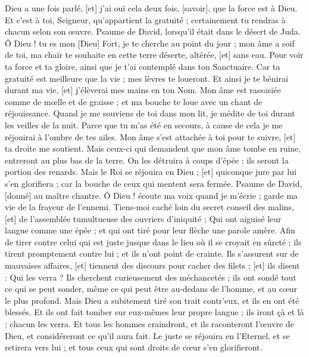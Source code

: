\begin{multicols}{2}
Dieu a une fois parlé, [et] j'ai ouï cela deux fois, [savoir], que la force est à Dieu.
Et c'est à toi, Seigneur, qu'appartient la gratuité ; certainement tu rendras à chacun selon son œuvre.
\VerseOne{}Psaume de David, lorsqu'il était dans le désert de Juda. Ô Dieu ! tu es mon [Dieu] Fort, je te cherche au point du jour ; mon âme a soif de toi, ma chair te souhaite en cette terre déserte, altérée, [et] sans eau.
Pour voir ta force et ta gloire, ainsi que je t'ai contemplé dans ton Sanctuaire.
Car ta gratuité est meilleure que la vie ; mes lèvres te loueront.
Et ainsi je te bénirai durant ma vie, [et] j'élèverai mes mains en ton Nom.
Mon âme est rassasiée comme de mœlle et de graisse ; et ma bouche te loue avec un chant de réjouissance.
Quand je me souviens de toi dans mon lit, je médite de toi durant les veilles de la nuit.
Parce que tu m'as été en secours, à cause de cela je me réjouirai à l'ombre de tes ailes.
Mon âme s'est attachée à toi pour te suivre, [et] ta droite me soutient.
Mais ceux-ci qui demandent que mon âme tombe en ruine, entreront au plus bas de la terre.
On les détruira à coups d'épée ; ils seront la portion des renards.
Mais le Roi se réjouira en Dieu ; [et] quiconque jure par lui s'en glorifiera ; car la bouche de ceux qui mentent sera fermée.
\VerseOne{}Psaume de David, [donné] au maître chantre. Ô Dieu ! écoute ma voix quand je m'écrie ; garde ma vie de la frayeur de l'ennemi.
Tiens-moi caché loin du secret conseil des malins, [et] de l'assemblée tumultueuse des ouvriers d'iniquité ;
Qui ont aiguisé leur langue comme une épée ; et qui ont tiré pour leur flèche une parole amère.
Afin de tirer contre celui qui est juste jusque dans le lieu où il se croyait en sûreté ; ils tirent promptement contre lui ; et ils n'ont point de crainte.
Ils s'assurent sur de mauvaises affaires, [et] tiennent des discours pour cacher des filets ; [et] ils disent : Qui les verra ?
Ils cherchent curieusement des méchancetés ; ils ont sondé tout ce qui se peut sonder, même ce qui peut être au-dedans de l'homme, et au cœur le plus profond.
Mais Dieu a subitement tiré son trait contr’eux, et ils en ont été blessés.
Et ils ont fait tomber sur eux-mêmes leur propre langue ; ils iront çà et là ; chacun les verra.
Et tous les hommes craindront, et ils raconteront l'œuvre de Dieu, et considéreront ce qu'il aura fait.
Le juste se réjouira en l'Eternel, et se retirera vers lui ; et tous ceux qui sont droits de cœur s'en glorifieront.

\end{multicols}
